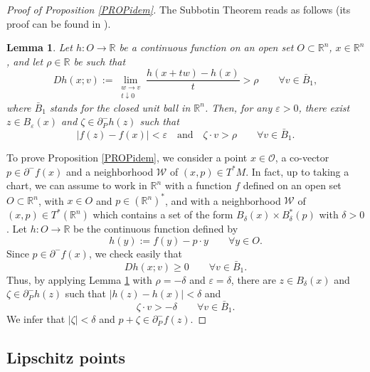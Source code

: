 \documentclass[JEP,XML,SOM,Unicode,NoFloatCountersInSection,published]{cedram}
\let\epsilon\varepsilon
\newcommand\R{\mathbb R}
\newtheorem{lemma}[theorem]{Lemma}
\theoremstyle{definition}
\begin{document}
\begin{proof}[Proof of Proposition \ref{PROPidem}]

The Subbotin Theorem reads as follows (its proof can be found in \cite[Th.\,4.2, p.\,137]{clsw98}).
\begin{lemma}\label{LEMSubbotin}
Let $h:O \to \R$ be a continuous function on an open set $O\subset \R^n$, $x\in \R^n$, and let $\rho \in \R$ be such that
\[
Dh(x;v) := \lim_{\substack{w\to v\\ t\downarrow 0}} \frac{h(x+tw)-h(x)}{t} > \rho \qquad \forall v \in \bar{B}_1,
\]
where $\bar{B}_1$ stands for the closed unit ball in $\R^n$. Then, for any $\epsilon >0$, there exist $z\in B_{\epsilon}(x)$ and $\zeta \in \partial^-_Ph(z)$ such that
\begin{equation*}
|f(z)-f(x)| < \epsilon \quad
\text{and} \quad \zeta \cdot v > \rho \qquad \forall v \in \bar{B}_1.
\end{equation*}
\end{lemma}
To prove Proposition \ref{PROPidem}, we consider a point $x\in \mathcal{O}$, a co-vector $p\in \partial^-f(x)$ and a neighborhood $\mathcal{W}$ of $(x,p)\in T^*M$. In fact, up to taking a chart, we can assume to work in $\R^n$ with a function $f$ defined on an open set $O\subset \R^n$, with $x\in O$ and $p\in (\R^n)^*$, and with a neighborhood $\mathcal{W}$ of $(x,p)\in T^*(\R^n)$ which contains a set of the form $B_{\delta}(x) \times B_{\delta}^*(p)$ with $\delta >0$. Let $h: O \to \R$ be the continuous function defined by
\[
h(y):=f(y)-p\cdot y \qquad \forall y \in O.
\]
Since $p\in \partial^-f(x)$, we check easily that
\[
Dh(x;v) \geq 0 \qquad \forall v \in \bar{B}_1.
\]
Thus, by applying Lemma \ref{LEMSubbotin} with $\rho=-\delta$ and $\epsilon=\delta$, there are $z \in B_{\delta}(x)$ and $\zeta \in \partial^-_Ph(z)$ such that $|h(z)-h(x)| < \delta$ and
\begin{equation*}
\zeta \cdot v > -\delta \qquad \forall v \in \bar{B}_1.
\end{equation*}
We infer that $|\zeta|<\delta$ and $p+\zeta \in \partial_P^-f(z)$.
\end{proof}

\subsection{Lipschitz points}
\end{document}
